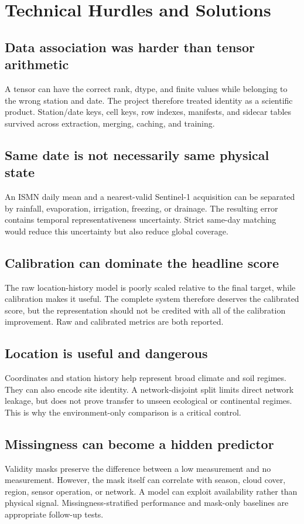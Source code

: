 \documentclass[12pt,a4paper]{report}
\begin{document}
\section{Technical Hurdles and Solutions}

\subsection{Data association was harder than tensor arithmetic}
A tensor can have the correct rank, dtype, and finite values while belonging to
the wrong station and date. The project therefore treated identity as a
scientific product. Station/date keys, cell keys, row indexes, manifests, and
sidecar tables survived across extraction, merging, caching, and training.

\subsection{Same date is not necessarily same physical state}
An ISMN daily mean and a nearest-valid Sentinel-1 acquisition can be separated
by rainfall, evaporation, irrigation, freezing, or drainage. The resulting
error contains temporal representativeness uncertainty. Strict same-day matching
would reduce this uncertainty but also reduce global coverage.

\subsection{Calibration can dominate the headline score}
The raw location-history model is poorly scaled relative to the final target,
while calibration makes it useful. The complete system therefore deserves the
calibrated score, but the representation should not be credited with all of the
calibration improvement. Raw and calibrated metrics are both reported.

\subsection{Location is useful and dangerous}
Coordinates and station history help represent broad climate and soil regimes.
They can also encode site identity. A network-disjoint split limits direct
network leakage, but does not prove transfer to unseen ecological or continental
regimes. This is why the environment-only comparison is a critical control.

\subsection{Missingness can become a hidden predictor}
Validity masks preserve the difference between a low measurement and no
measurement. However, the mask itself can correlate with season, cloud cover,
region, sensor operation, or network. A model can exploit availability rather
than physical signal. Missingness-stratified performance and mask-only
baselines are appropriate follow-up tests.
\end{document}
